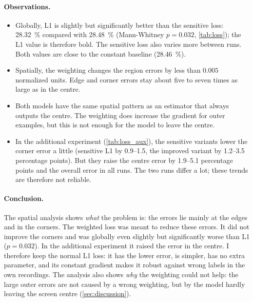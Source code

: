 \paragraph{Observations.}
\begin{itemize}[nosep]
  \item Globally, L1 is slightly but significantly better than the sensitive
        loss: \SI{28.32}{\percent} compared with \SI{28.48}{\percent}
        (Mann-Whitney $p=0.032$, \cref{tab:loss}); the L1 value is therefore
        bold. The sensitive loss also varies more between runs. Both values
        are close to the constant baseline (\SI{28.46}{\percent}).
  \item Spatially, the weighting changes the region errors by less than
        $0.005$ normalized units. Edge and corner errors stay about five to
        seven times as large as in the centre.
  \item Both models have the same spatial pattern as an estimator that always
        outputs the centre. The weighting does increase the gradient for outer
        examples, but this is not enough for the model to leave the centre.
  \item In the additional experiment (\cref{tab:loss_aux}), the sensitive
        variants lower the corner error a little (sensitive L1 by
        \num{0.9}--\num{1.5}, the improved variant by \num{1.2}--\num{3.5}
        percentage points). But they raise the centre error by
        \num{1.9}--\num{5.1} percentage points and the overall error in all
        runs. The two runs differ a lot; these trends are therefore not
        reliable.
\end{itemize}

\paragraph{Conclusion.}
The spatial analysis shows \emph{what} the problem is: the errors lie mainly at
the edges and in the corners. The weighted loss was meant to reduce these
errors. It did not improve the corners and was globally even slightly but
significantly worse than L1 ($p=0.032$). In the additional experiment it raised
the error in the centre. I therefore keep the normal L1 loss: it has the lower
error, is simpler, has no extra parameter, and its constant gradient makes it
robust against wrong labels in the own recordings. The analysis also shows
\emph{why} the weighting could not help: the large outer errors are not caused
by a wrong weighting, but by the model hardly leaving the screen centre
(\cref{sec:discussion}).

